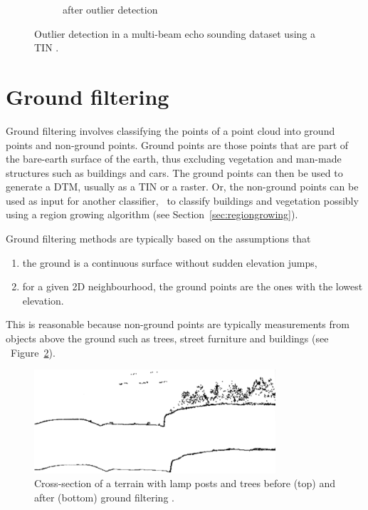 \begin{figure}
\begin{subfigure}[b]{0.4\linewidth}
    \caption{after outlier detection}
  \end{subfigure}
\caption{Outlier detection in a multi-beam echo sounding dataset using a TIN \citep{Arge10}.}
\label{fig:mbes}
\end{figure}


%

\section{Ground filtering}
Ground filtering involves classifying the points of a point cloud into ground points and non-ground points.
Ground points are those points that are part of the bare-earth surface of the earth, thus excluding vegetation and man-made structures such as buildings and cars.
The ground points can then be used to generate a DTM, usually as a TIN or a raster.
Or, the non-ground points can be used as input for another classifier, \eg\ to classify buildings and vegetation possibly using a region growing algorithm (see Section~\ref{sec:regiongrowing}).

Ground filtering methods are typically based on the assumptions that 
\begin{enumerate}
  \item the ground is a continuous surface without sudden elevation jumps, 
  \item for a given 2D neighbourhood, the ground points are the ones with the lowest elevation.
\end{enumerate}
This is reasonable because non-ground points are typically measurements from objects above the ground such as trees, street furniture and buildings (see \eg\ Figure~\ref{fig:axelsson:profiles}).

\begin{figure}
  \centering
  \includegraphics[width=0.8\textwidth]{figs/axelsson-profiles.png}
  \caption{Cross-section of a terrain with lamp posts and trees before (top) and after (bottom) ground filtering \citep{axelsson2000generation}.}
\label{fig:axelsson:profiles}
\end{figure}

